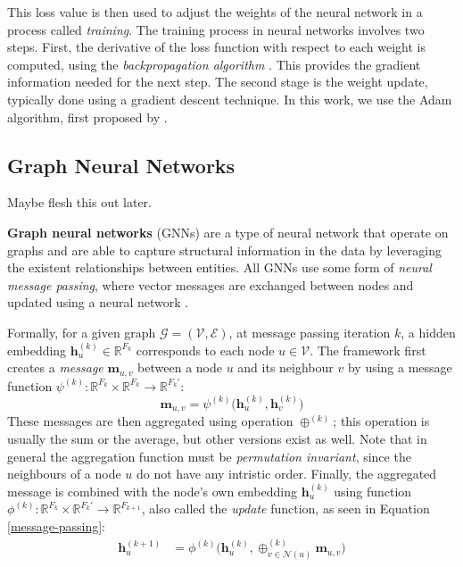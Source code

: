 This loss value is then used to adjust the weights of the neural network in a process called \textit{training}. The training process in neural networks involves two steps. First, the derivative of the loss function with respect to each weight is computed, using the \textit{backpropagation algorithm} \citep{backpropagation1}. This provides the gradient information needed for the next step. The second stage is the weight update, typically done using a gradient descent technique. In this work, we use the Adam algorithm, first proposed by \cite{adam}.

\subsection{Graph Neural Networks}
{\color{blue}Maybe flesh this out later.}

\textbf{Graph neural networks} (GNNs) are a type of neural network that operate on graphs and are able to capture structural information in the data by leveraging the existent relationships between entities. 
All GNNs use some form of \textit{neural message passing}, where vector messages are exchanged between nodes and updated using a neural network \citep{gilmer2017neural}.

Formally, for a given graph $\mathcal{G} = (\mathcal{V}, \mathcal{E})$, at message passing iteration $k$, a hidden embedding $\textbf{h}_u^{(k)} \in \mathbb{R}^{F_k}$ corresponds to each node $u \in \mathcal{V}$. 
The framework first creates a \textit{message} $\mathbf{m}_{u,v}$ between a node $u$ and its neighbour $v$ by using a message function $\psi^{(k)}: \mathbb{R}^{F_k}\times\mathbb{R}^{F_k} \rightarrow \mathbb{R}^{F_{k}'}$:
\begin{equation}
    \mathbf{m}_{u, v} = \psi^{(k)}\Big(\textbf{h}_{u}^{(k)}, \textbf{h}_v^{(k)}\Big)
\end{equation}
These messages are then aggregated using operation $\oplus^{(k)}$; 
this operation is usually the sum or the average, but other versions exist as well. Note that in general the aggregation function must be \textit{permutation invariant}, since the neighbours of a node $u$ do not have any intristic order.
Finally, the aggregated message is combined with the node's own embedding $\mathbf{h}_u^{(k)}$ using function $\phi^{(k)}:\mathbb{R}^{F_k} \times \mathbb{R}^{F_{k}'} \rightarrow \mathbb{R}^{F_{k+1}}$, also called the \textit{update} function, as seen in Equation \ref{message-passing}:
\begin{align}
    \textbf{h}_u^{(k+1)} &= \phi^{(k)}\Big(\textbf{h}_u^{(k)}, \oplus_{v\in \mathcal{N}(u)}^{(k)}\mathbf{m}_{u,v}\Big)
\label{message-passing}
\end{align}

